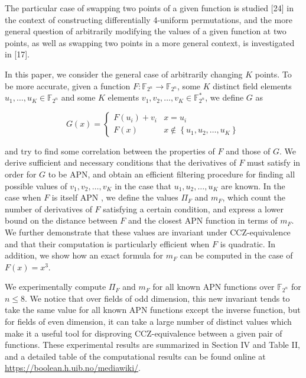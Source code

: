 \documentclass[10pt]{article}
\begin{document}
The particular case of swapping two points of a given function is studied [24] in the context of constructing differentially 4-uniform permutations, and the more general question of arbitrarily modifying the values of a given function at two points, as well as swapping two points in a more general context, is investigated in [17].

In this paper, we consider the general case of arbitrarily changing $K$ points. To be more accurate, given a function $F: \mathbb{F}_{2^{n}} \rightarrow \mathbb{F}_{2^{n}}$, some $K$ distinct field elements $u_{1}, \ldots, u_{K} \in \mathbb{F}_{2^{n}}$ and some $K$ elements $v_{1}, v_{2}, \ldots, v_{K} \in \mathbb{F}_{2^{n}}^{*}$, we define $G$ as

$$
G(x)= \begin{cases}F\left(u_{i}\right)+v_{i} & x=u_{i} \\ F(x) & x \notin\left\{u_{1}, u_{2}, \ldots, u_{K}\right\}\end{cases}
$$

and try to find some correlation between the properties of $F$ and those of $G$. We derive sufficient and necessary conditions that the derivatives of $F$ must satisfy in order for $G$ to be APN, and obtain an efficient filtering procedure for finding all possible values of $v_{1}, v_{2}, \ldots, v_{K}$ in the case that $u_{1}, u_{2}, \ldots, u_{K}$ are known. In the case when $F$ is itself APN , we define the values $\Pi_{F}$ and $m_{F}$, which count the number of derivatives of $F$ satisfying a certain condition, and express a lower bound on the distance between $F$ and the closest APN function in terms of $m_{F}$. We further demonstrate that these values are invariant under CCZ-equivalence and that their computation is particularly efficient when $F$ is quadratic. In addition, we show how an exact formula for $m_{F}$ can be computed in the case of $F(x)=x^{3}$.

We experimentally compute $\Pi_{F}$ and $m_{F}$ for all known APN functions over $\mathbb{F}_{2^{n}}$ for $n \leq 8$. We notice that over fields of odd dimension, this new invariant tends to take the same value for all known APN functions except the inverse function, but for fields of even dimension, it can take a large number of distinct values which make it a useful tool for disproving CCZ-equivalence between a given pair of functions. These experimental results are summarized in Section IV and Table II, and a detailed table of the computational results can be found online at \href{https://boolean.h.uib.no/mediawiki/}{https://boolean.h.uib.no/mediawiki/}.
\end{document}

